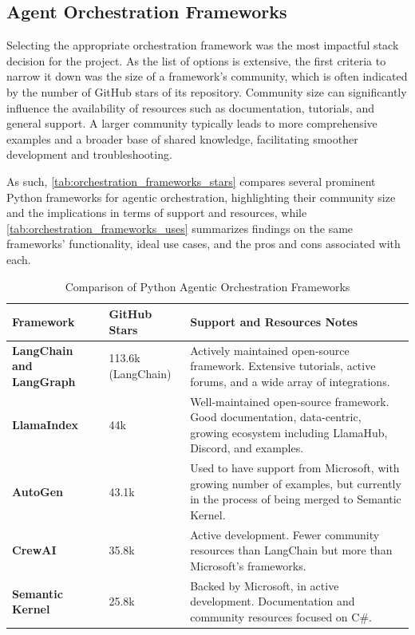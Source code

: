 \documentclass[a4paper]{report}
\begin{document}
\subsection{Agent Orchestration Frameworks}

Selecting the appropriate orchestration framework was the most impactful stack decision for the project. As the list of options is extensive, the first criteria to narrow it down was the size of a framework's community, which is often indicated by the number of GitHub stars of its repository. Community size can significantly influence the availability of resources such as documentation, tutorials, and general support. A larger community typically leads to more comprehensive examples and a broader base of shared knowledge, facilitating smoother development and troubleshooting.

As such, \autoref{tab:orchestration_frameworks_stars} compares several prominent Python frameworks for agentic orchestration, highlighting their community size and the implications in terms of support and resources, while \autoref{tab:orchestration_frameworks_uses} summarizes findings on the same frameworks' functionality, ideal use cases, and the pros and cons associated with each.

\begin{table}[h]
\centering
\begin{tabular}{|p{3cm}|p{2.5cm}|p{8.2cm}|}
    \hline
    \textbf{Framework} & \textbf{GitHub Stars} & \textbf{Support and Resources Notes} \\ \hline
    \textbf{LangChain and \newline LangGraph} & 113.6k \newline (LangChain) & Actively maintained open-source framework. Extensive tutorials, active forums, and a wide array of integrations. \\ \hline
    \textbf{LlamaIndex} & 44k & Well-maintained open-source framework. Good documentation, data-centric, growing ecosystem including LlamaHub, Discord, and examples. \\ \hline
    \textbf{AutoGen} & 43.1k & Used to have support from Microsoft, with growing number of examples, but currently in the process of being merged to Semantic Kernel. \\ \hline
    \textbf{CrewAI} & 35.8k & Active development. Fewer community resources than LangChain but more than Microsoft's frameworks. \\ \hline
    \textbf{Semantic Kernel} & 25.8k & Backed by Microsoft, in active development. Documentation and community resources focused on C\#. \\ \hline
\end{tabular}
\caption{Comparison of Python Agentic Orchestration Frameworks}
\label{tab:orchestration_frameworks_stars}
\end{table}
\end{document}

